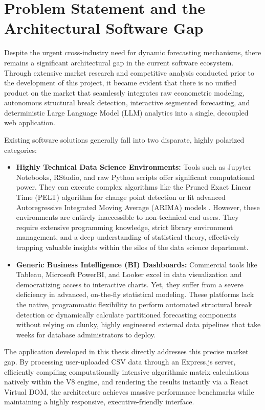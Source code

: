 \section{Problem Statement and the Architectural Software Gap}
Despite the urgent cross-industry need for dynamic forecasting mechanisms, there remains a significant architectural gap in the current software ecosystem. Through extensive market research and competitive analysis conducted prior to the development of this project, it became evident that there is no unified product on the market that seamlessly integrates raw econometric modeling, autonomous structural break detection, interactive segmented forecasting, and deterministic Large Language Model (LLM) analytics into a single, decoupled web application.

Existing software solutions generally fall into two disparate, highly polarized categories:
\begin{itemize}
    \item \textbf{Highly Technical Data Science Environments:} Tools such as Jupyter Notebooks, RStudio, and raw Python scripts offer significant computational power. They can execute complex algorithms like the Pruned Exact Linear Time (PELT) algorithm for change point detection \cite{Killick2012} or fit advanced Autoregressive Integrated Moving Average (ARIMA) models \cite{BoxJenkins1970}. However, these environments are entirely inaccessible to non-technical end users. They require extensive programming knowledge, strict library environment management, and a deep understanding of statistical theory, effectively trapping valuable insights within the silos of the data science department.
    \item \textbf{Generic Business Intelligence (BI) Dashboards:} Commercial tools like Tableau, Microsoft PowerBI, and Looker excel in data visualization and democratizing access to interactive charts. Yet, they suffer from a severe deficiency in advanced, on-the-fly statistical modeling. These platforms lack the native, programmatic flexibility to perform automated structural break detection or dynamically calculate partitioned forecasting components without relying on clunky, highly engineered external data pipelines that take weeks for database administrators to deploy.
\end{itemize}

The application developed in this thesis directly addresses this precise market gap. By processing user-uploaded CSV data through an Express.js server, efficiently compiling computationally intensive algorithmic matrix calculations natively within the V8 engine, and rendering the results instantly via a React Virtual DOM, the architecture achieves massive performance benchmarks while maintaining a highly responsive, executive-friendly interface.


